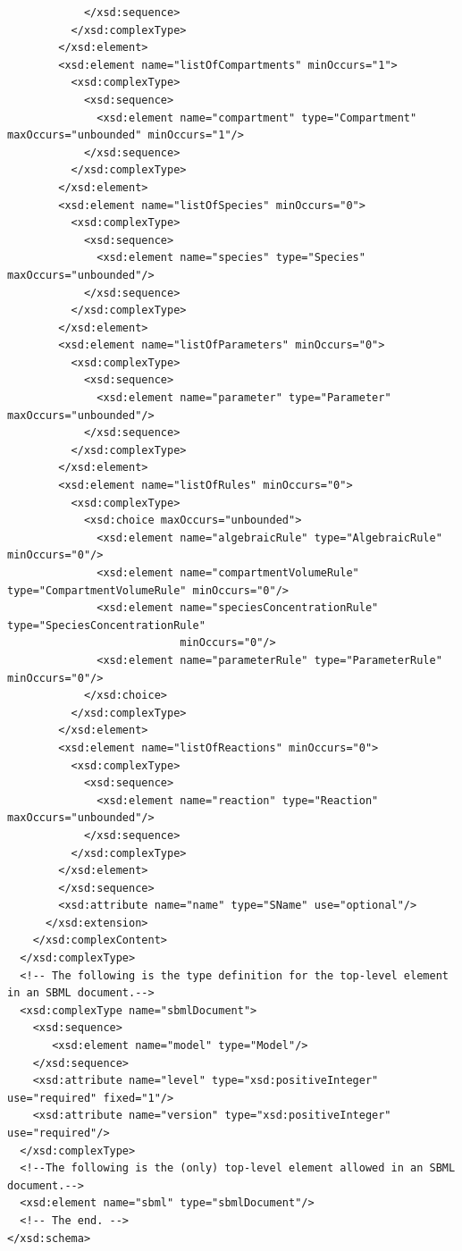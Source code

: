 \documentclass[10pt]{cekarticle}
\newenvironment{blockChanged}{\color{BrickRed}}{}
\begin{document}
\begin{blockChanged}
\begin{small}
\begin{verbatim}
            </xsd:sequence>
          </xsd:complexType>
        </xsd:element>
        <xsd:element name="listOfCompartments" minOccurs="1">
          <xsd:complexType>
            <xsd:sequence>
              <xsd:element name="compartment" type="Compartment" maxOccurs="unbounded" minOccurs="1"/>
            </xsd:sequence>
          </xsd:complexType>
        </xsd:element>
        <xsd:element name="listOfSpecies" minOccurs="0">
          <xsd:complexType>
            <xsd:sequence>
              <xsd:element name="species" type="Species" maxOccurs="unbounded"/>
            </xsd:sequence>
          </xsd:complexType>
        </xsd:element>
        <xsd:element name="listOfParameters" minOccurs="0">
          <xsd:complexType>
            <xsd:sequence>
              <xsd:element name="parameter" type="Parameter" maxOccurs="unbounded"/>
            </xsd:sequence>
          </xsd:complexType>
        </xsd:element>
        <xsd:element name="listOfRules" minOccurs="0">
          <xsd:complexType>
            <xsd:choice maxOccurs="unbounded">
              <xsd:element name="algebraicRule" type="AlgebraicRule" minOccurs="0"/>
              <xsd:element name="compartmentVolumeRule" type="CompartmentVolumeRule" minOccurs="0"/>
              <xsd:element name="speciesConcentrationRule" type="SpeciesConcentrationRule" 
                           minOccurs="0"/>
              <xsd:element name="parameterRule" type="ParameterRule" minOccurs="0"/>
            </xsd:choice>
          </xsd:complexType>
        </xsd:element>
        <xsd:element name="listOfReactions" minOccurs="0">
          <xsd:complexType>
            <xsd:sequence>
              <xsd:element name="reaction" type="Reaction" maxOccurs="unbounded"/>
            </xsd:sequence>
          </xsd:complexType>
        </xsd:element>
      	</xsd:sequence>
      	<xsd:attribute name="name" type="SName" use="optional"/>
      </xsd:extension>
    </xsd:complexContent>
  </xsd:complexType>
  <!-- The following is the type definition for the top-level element in an SBML document.-->
  <xsd:complexType name="sbmlDocument">
    <xsd:sequence>
       <xsd:element name="model" type="Model"/>
    </xsd:sequence>
    <xsd:attribute name="level" type="xsd:positiveInteger" use="required" fixed="1"/>
    <xsd:attribute name="version" type="xsd:positiveInteger" use="required"/>
  </xsd:complexType>
  <!--The following is the (only) top-level element allowed in an SBML document.-->
  <xsd:element name="sbml" type="sbmlDocument"/>
  <!-- The end. -->
</xsd:schema>
\end{verbatim}
\regularspacing
\end{small}
\end{blockChanged}
\end{document}
